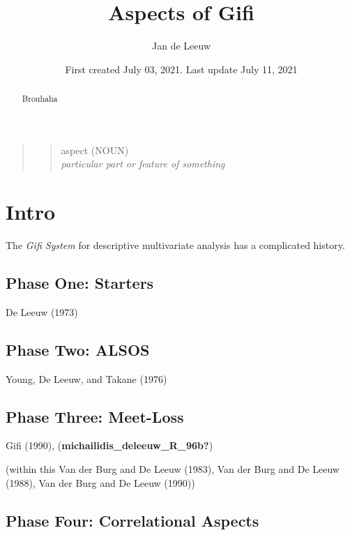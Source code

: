 \documentclass[
  12pt,
]{article}
\title{Aspects of Gifi}
\author{Jan de Leeuw}
\date{First created July 03, 2021. Last update July 11, 2021}
\begin{document}
\maketitle
\begin{abstract}
Brouhaha
\end{abstract}

{
\setcounter{tocdepth}{4}
\tableofcontents
}
\begin{quote}
\begin{quote}
aspect (NOUN)\\
\emph{particular part or feature of something}
\end{quote}
\end{quote}

\hypertarget{intro}{%
\section{Intro}\label{intro}}

The \emph{Gifi System} for descriptive multivariate analysis has a
complicated history.

\hypertarget{phase-one-starters}{%
\subsection{Phase One: Starters}\label{phase-one-starters}}

De Leeuw (1973)

\hypertarget{phase-two-alsos}{%
\subsection{Phase Two: ALSOS}\label{phase-two-alsos}}

Young, De Leeuw, and Takane (1976)

\hypertarget{phase-three-meet-loss}{%
\subsection{Phase Three: Meet-Loss}\label{phase-three-meet-loss}}

Gifi (1990), (\textbf{michailidis\_deleeuw\_R\_96b?})

(within this
Van der Burg and De Leeuw (1983),
Van der Burg and De Leeuw (1988),
Van der Burg and De Leeuw (1990))

\hypertarget{phase-four-correlational-aspects}{%
\subsection{Phase Four: Correlational Aspects}\label{phase-four-correlational-aspects}}
\end{document}
